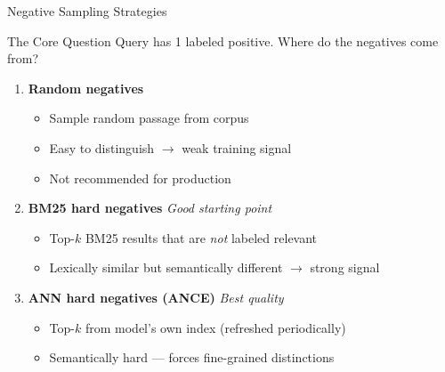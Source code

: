 \documentclass[aspectratio=169]{beamer}
\newif\ifanimated
\newcommand{\cpause}{\ifanimated\pause\fi}
\begin{document}
\begin{frame}{Negative Sampling Strategies}
\begin{block}{The Core Question}
Query has 1 labeled positive. Where do the negatives come from?
\end{block}

\vspace{0.5em}

\begin{enumerate}
    \item \textbf{Random negatives}
    \begin{itemize}
        \item Sample random passage from corpus
        \item Easy to distinguish $\to$ weak training signal
        \item \textcolor{red}{} Not recommended for production
    \end{itemize}

    \cpause
    \vspace{0.3em}

    \item \textbf{BM25 hard negatives} \textcolor{green}{\checkmark} \textit{Good starting point}
    \begin{itemize}
        \item Top-$k$ BM25 results that are \textit{not} labeled relevant
        \item Lexically similar but semantically different $\to$ strong signal
    \end{itemize}

    \cpause
    \vspace{0.3em}

    \item \textbf{ANN hard negatives (ANCE)} \textcolor{green}{\checkmark} \textit{Best quality}
    \begin{itemize}
        \item Top-$k$ from model's own index (refreshed periodically)
        \item Semantically hard --- forces fine-grained distinctions
    \end{itemize}
\end{enumerate}
\end{frame}
\end{document}
